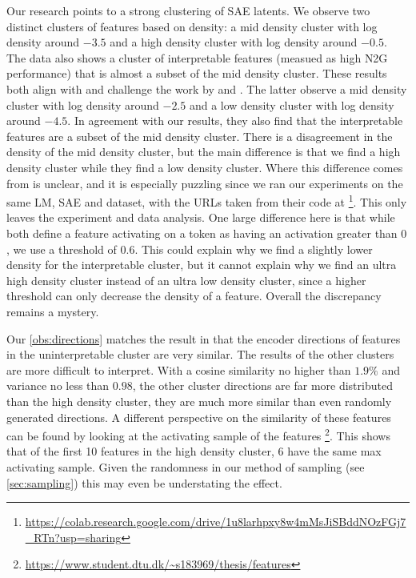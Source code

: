 Our research points to a strong clustering of SAE latents.
We observe two distinct clusters of features based on density: a mid density cluster with log density around $-3.5$ and a high density cluster with log density around $-0.5$.
The data also shows a cluster of interpretable features (measued as high \ac{N2G} performance) that is almost a subset of the mid density cluster.
These results both align with and challenge the work by \textcite{bricken_towards_2023} and \textcite{nanda_open_2023}.
The latter observe a mid density cluster with log density around $-2.5$ and a low density cluster with log density around $-4.5$.
In agreement with our results, they also find that the interpretable features are a subset of the mid density cluster.
There is a disagreement in the density of the mid density cluster, but the main difference is that we find a high density cluster while they find a low density cluster.
Where this difference comes from is unclear, and it is especially puzzling since we ran our experiments on the same \ac{LM}, \ac{SAE} and dataset, with the URLs taken from their code at \footnote{\url{https://colab.research.google.com/drive/1u8larhpxy8w4mMsJiSBddNOzFGj7_RTn?usp=sharing}}.
This only leaves the experiment and data analysis.
One large difference here is that while both  define a feature activating on a token as having an activation greater than $0$, we use a threshold of $0.6$.
This could explain why we find a slightly lower density for the interpretable cluster, but it cannot explain why we find an ultra high density cluster instead of an ultra low density cluster, since a higher threshold can only decrease the density of a feature.
Overall the discrepancy remains a mystery.

Our \ref{obs:directions} matches the result in \textcite{nanda_open_2023} that the encoder directions of features in the uninterpretable cluster are very similar.
The results of the other clusters are more difficult to interpret.
With a cosine similarity no higher than $1.9\%$ and variance no less than $0.98$, the other cluster directions are far more distributed than the high density cluster, they are much more similar than even randomly generated directions.
A different perspective on the similarity of these features can be found by looking at the activating sample of the features \footnote{\url{https://www.student.dtu.dk/~s183969/thesis/features}}.
This shows that of the first 10 features in the high density cluster, 6 have the same max activating sample.
Given the randomness in our method of sampling (see \autoref{sec:sampling}) this may even be understating the effect.


